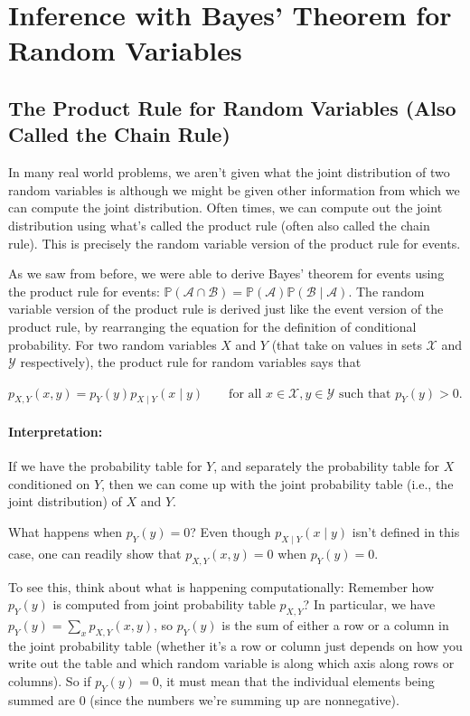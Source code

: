 \documentclass[6008notes.tex]{subfiles}
\begin{document}
\graphicspath{ {images/infbayes/} }

\section{Inference with Bayes' Theorem for Random Variables}

\subsection{The Product Rule for Random Variables (Also Called the Chain Rule)}

In many real world problems, we aren't given what the joint distribution of two random variables is although we might be given other information from which we can compute the joint distribution. Often times, we can compute out the joint distribution using what's called the product rule (often also called the chain rule). This is precisely the random variable version of the product rule for events.

As we saw from before, we were able to derive Bayes' theorem for events using the product rule for events: $\mathbb {P}(\mathcal{A} \cap \mathcal{B}) = \mathbb {P}(\mathcal{A}) \mathbb {P}(\mathcal{B} \mid \mathcal{A})$. The random variable version of the product rule is derived just like the event version of the product rule, by rearranging the equation for the definition of conditional probability. For two random variables $X$ and $Y$ (that take on values in sets $\mathcal{X}$ and $\mathcal{Y}$ respectively), the product rule for random variables says that

$p_{X,Y}(x,y)=p_{Y}(y)p_{X\mid Y}(x\mid y)\qquad \text {for all }x\in \mathcal{X},y\in \mathcal{Y}\text { such that }p_{Y}(y)>0.$
 
\paragraph{Interpretation:} If we have the probability table for $Y$, and separately the probability table for $X$ conditioned on $Y$, then we can come up with the joint probability table (i.e., the joint distribution) of $X$ and $Y$.

What happens when $p_{Y}(y)=0$? Even though $p_{X\mid Y}(x\mid y)$ isn't defined in this case, one can readily show that $p_{X,Y}(x,y)=0$ when $p_{Y}(y)=0$.

To see this, think about what is happening computationally: Remember how $p_Y(y)$ is computed from joint probability table $p_{X,Y}$? In particular, we have $p_{Y}(y)=\sum _{x}p_{X,Y}(x,y)$, so $p_Y(y)$ is the sum of either a row or a column in the joint probability table (whether it's a row or column just depends on how you write out the table and which random variable is along which axis along rows or columns). So if $p_{Y}(y)=0$, it must mean that the individual elements being summed are 0 (since the numbers we're summing up are nonnegative).
\end{document}
